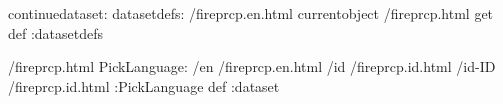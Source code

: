 \begin{ingrid}
continuedataset:
datasetdefs:
/fireprcp.en.html currentobject /fireprcp.html get def
:datasetdefs

/fireprcp.html {
PickLanguage:
/en /fireprcp.en.html
/id /fireprcp.id.html
/id-ID /fireprcp.id.html
:PickLanguage
} def
:dataset
\end{ingrid}
